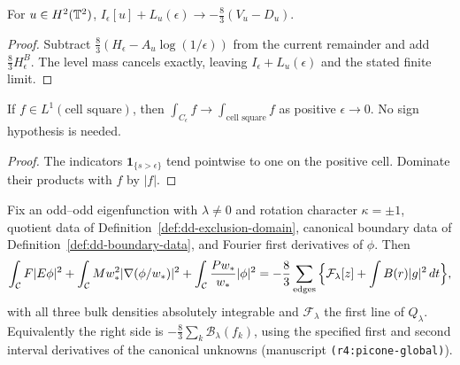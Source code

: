 \begin{lemma}
\label{lem:dd-ground-current-limit}
\leanok
For $u\in H^2(\mathbb{T}^2)$,
$I_\epsilon[u]+L_u(\epsilon)\to-\tfrac83(V_u-D_u)$.
\end{lemma}

\begin{proof}
\leanok
Subtract $\tfrac83(H_\epsilon-A_u\log(1/\epsilon))$ from the current
remainder and add $\tfrac83H^B_\epsilon$. The level mass cancels exactly,
leaving $I_\epsilon+L_u(\epsilon)$ and the stated finite limit.
\end{proof}

\begin{lemma}
\label{lem:dd-truncation-exhaustion}
\leanok
If $f\in L^1(\text{cell square})$, then
$\int_{C_\epsilon}f\to\int_{\text{cell square}}f$ as positive
$\epsilon\to0$. No sign hypothesis is needed.
\end{lemma}

\begin{proof}
\leanok
The indicators $\mathbf1_{\{s>\epsilon\}}$ tend pointwise to one on the
positive cell. Dominate their products with $f$ by $|f|$.
\end{proof}

\begin{lemma}
\label{lem:dd-picone-current}
\leanok
Fix an odd--odd eigenfunction with $\lambda\ne0$ and rotation character
$\kappa=\pm1$, quotient data of Definition~\ref{def:dd-exclusion-domain},
canonical boundary data of Definition~\ref{def:dd-boundary-data}, and
Fourier first derivatives of $\phi$. Then
\[
  \int_{\mathcal{C}} F|E\phi|^2+\int_{\mathcal{C}} Mw_*^2|\nabla(\phi/w_*)|^2
  +\int_{\mathcal{C}}\frac{Pw_*}{w_*}|\phi|^2
  =-\frac83\sum_{\text{edges}}\Big\{\mathcal F_\lambda[z]+\int B(r)|g|^2\,dt\Big\},
\]
with all three bulk densities absolutely integrable and
$\mathcal F_\lambda$ the first line of $Q_\lambda$. Equivalently the right
side is $-\tfrac83\sum_k\mathcal B_\lambda(f_k)$, using the specified
first and second interval derivatives of the canonical unknowns
(manuscript \texttt{(r4:picone-global)}).
\end{lemma}

